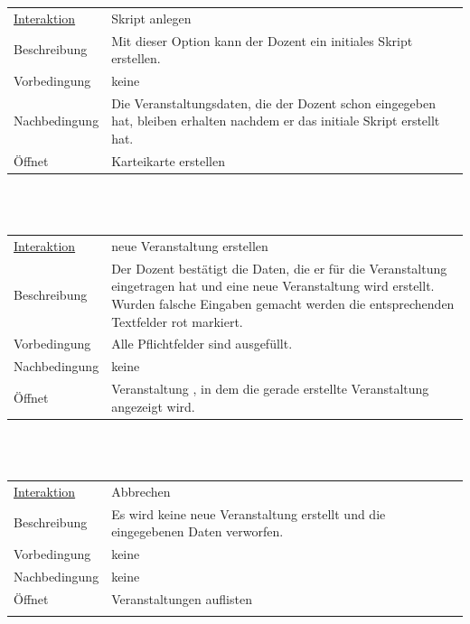 \documentclass[12pt,a4paper]{article}
\begin{document}
{\begin{tabular}{l p{12cm}}
\underline{Interaktion}  	 & Skript anlegen\\ 
Beschreibung   	 & Mit dieser Option kann der Dozent ein initiales Skript erstellen.\\
Vorbedingung   	 & keine\\
Nachbedingung 	 & Die Veranstaltungsdaten, die der Dozent schon eingegeben hat, bleiben erhalten nachdem er das initiale Skript erstellt hat.\\
Öffnet			 & \glqq Karteikarte erstellen\grqq \\
\end{tabular}\\\\

\begin{tabular}{l p{12cm}}
\underline{Interaktion}  	 & neue Veranstaltung erstellen\\ 
Beschreibung   	 & Der Dozent bestätigt die Daten, die er für die Veranstaltung eingetragen hat und eine neue Veranstaltung wird erstellt. Wurden falsche Eingaben gemacht werden die entsprechenden Textfelder rot markiert. \\
Vorbedingung   	 & Alle Pflichtfelder sind ausgefüllt.\\
Nachbedingung	 & keine\\
Öffnet			 & \glqq Veranstaltung \grqq, in dem die gerade erstellte Veranstaltung angezeigt wird. \\
\end{tabular}\\\\

\begin{tabular}{l p{12cm}}
\underline{Interaktion}  	 & Abbrechen\\ 
Beschreibung   	 & Es wird keine neue Veranstaltung erstellt und die eingegebenen Daten verworfen.  \\
Vorbedingung	 & keine \\
Nachbedingung	 & keine \\
Öffnet			 & \glqq Veranstaltungen auflisten\grqq \\\\
\end{tabular}\\\\

\begin{figure}[H]
	\centering

\end{figure}}
\end{document}
